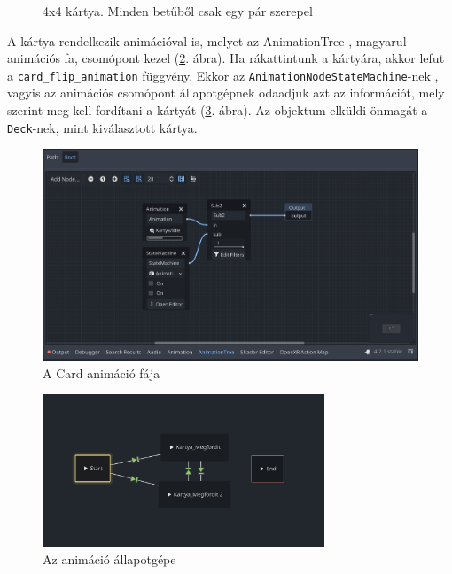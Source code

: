 \begin{figure}[H]
\begin{minipage}[b]{0.45\textwidth}
        \caption{4x4 kártya. Minden betűből csak egy pár szerepel}
        \label{img:cards_has_pairs}  
    \end{minipage}
\end{figure}

A kártya rendelkezik animációval is, melyet az AnimationTree \cite{Animatio38:online}, magyarul animációs fa, csomópont kezel (\ref{img:animation_tree}. ábra). 
Ha rákattintunk a kártyára, akkor lefut a \lstinline|card_flip_animation| függvény.
Ekkor az \lstinline|AnimationNodeStateMachine|-nek \cite{Animatio50:online}, vagyis az animációs csomópont állapotgépnek odaadjuk azt az információt, mely szerint meg kell fordítani a kártyát (\ref{img:state_machine}. ábra).
Az objektum elküldi önmagát a \lstinline|Deck|-nek, mint kiválasztott kártya. 
\begin{figure}[h]
    \centering
    \includegraphics[width=\textwidth]{img/animation_tree.png}
    \caption{A Card animáció fája}
    \label{img:animation_tree}  
\end{figure}

\begin{figure}[h]
    \centering
    \includegraphics[width=0.75\textwidth]{img/allapotgep.png}
    \caption{Az animáció állapotgépe}
    \label{img:state_machine}  
\end{figure}



